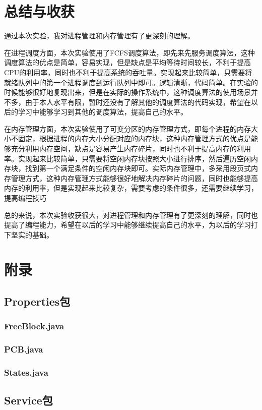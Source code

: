 \documentclass[UTF8,12pt]{article}
\begin{document}
\section{总结与收获}
通过本次实验，我对进程管理和内存管理有了更深刻的理解。

在进程调度方面，本次实验使用了FCFS调度算法，即先来先服务调度算法，这种调度算法的优点是简单，容易实现，但是缺点是平均等待时间较长，不利于提高CPU的利用率，同时也不利于提高系统的吞吐量。实现起来比较简单，只需要将就绪队列中的第一个进程调度到运行队列中即可。逻辑清晰，代码简单。在实验的时候能够很好地复现出来，但是在实际的操作系统中，这种调度算法的使用场景并不多，由于本人水平有限，暂时还没有了解其他的调度算法的代码实现，希望在以后的学习中能够学习到其他的调度算法，提高自己的水平。

在内存管理方面，本次实验使用了可变分区的内存管理方式，即每个进程的内存大小不固定，根据进程的内存大小分配对应的内存块，这种内存管理方式的优点是能够充分利用内存空间，缺点是容易产生内存碎片，同时也不利于提高内存的利用率。实现起来比较简单，只需要将空闲内存块按照大小进行排序，然后遍历空闲内存块，找到第一个满足条件的空闲内存块即可。实际内存管理中，多采用段页式内存管理方式，这种内存管理方式能够很好地解决内存碎片的问题，同时也能够提高内存的利用率，但是实现起来比较复杂，需要考虑的条件很多，还需要继续学习，提高编程技巧

总的来说，本次实验收获很大，对进程管理和内存管理有了更深刻的理解，同时也提高了编程能力，希望在以后的学习中能够继续提高自己的水平，为以后的学习打下坚实的基础。

\section{附录}
\subsection{Properties包}
\subsubsection{FreeBlock.java}
\subsubsection{PCB.java}
\subsubsection{States.java}

\subsection{Service包}
\end{document}
